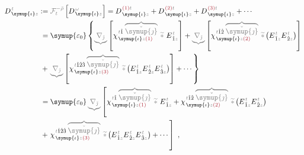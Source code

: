 \begin{subequations}
\begin{align}
	D^{\;\!\mathcolor{gray}{t}}_{\;\! \symup{\iota}\mathcolor{gray}{z}} &:= \mathcolor{gray}{\mathcal F^{-\bar{\rho}}_{t}} \left[ D^{\;\! \mathcolor{gray}{\omega}}_{\;\! \symup{\iota}\mathcolor{gray}{z}} \right] = D^{\;\! \textcolor{Maroon}{(1)} \mathcolor{gray}{t}}_{\;\! \symup{\iota}\mathcolor{gray}{z}} + D^{\;\! \textcolor{Maroon}{(2)} \mathcolor{gray}{t}}_{\;\! \symup{\iota}\mathcolor{gray}{z}} + D^{\;\! \textcolor{Maroon}{(3)} \mathcolor{gray}{t}}_{\;\! \symup{\iota}\mathcolor{gray}{z}} + \cdots \\
	&\hphantom{:}= {\symup{\varepsilon_0}} \left\{ \mathcolor{gray}{\underbrace{\nabla_{\check{\jmath}}}} \left[ \chi^{\;\! \mathcolor{gray}{t} \hat{1} \;\! \mathcolor{gray}{\overbrace{\check{\symup{\jmath}}}}}_{\;\! \symup{\iota} \mathcolor{gray}{z} \textcolor{Maroon}{(1)}} ~\mathcolor{gray}{\widetilde *}~ E^{\;\!\mathcolor{gray}{t}}_{\;\! \hat{1} \mathcolor{gray}{z}} \right] + \mathcolor{gray}{\underbrace{\nabla_{\check{\jmath}}}} \left[ \chi^{\;\! \mathcolor{gray}{t} \hat{1} \hat{2} \;\! \mathcolor{gray}{\overbrace{\check{\symup{\jmath}}}}}_{\;\! \symup{\iota} \mathcolor{gray}{z} \textcolor{Maroon}{(2)}} ~\mathcolor{gray}{\widetilde *} \left( E^{\;\!\mathcolor{gray}{t}}_{\;\! \hat{1} \mathcolor{gray}{z}} E^{\;\!\mathcolor{gray}{t}}_{\;\! \hat{2} \mathcolor{gray}{z}} \right) \right] \right. \label{eq:D_trho} \\ &\hphantom{:}+ \left. \mathcolor{gray}{\underbrace{\nabla_{\check{\jmath}}}} \left[ \chi^{\;\! \mathcolor{gray}{t} \hat{1} \hat{2} \hat{3} \;\! \mathcolor{gray}{\overbrace{\check{\symup{\jmath}}}}}_{\;\! \symup{\iota} \mathcolor{gray}{z} \textcolor{Maroon}{(3)}} ~\mathcolor{gray}{\widetilde *} \left( E^{\;\!\mathcolor{gray}{t}}_{\;\! \hat{1} \mathcolor{gray}{z}} E^{\;\!\mathcolor{gray}{t}}_{\;\! \hat{2} \mathcolor{gray}{z}} E^{\;\!\mathcolor{gray}{t}}_{\;\! \hat{3} \mathcolor{gray}{z}} \right) \right] + \cdots \right\}  \\
	&\hphantom{:}= {\symup{\varepsilon_0}} \mathcolor{gray}{\underbrace{\nabla_{\check{\jmath}}}} \left[ \chi^{\;\! \mathcolor{gray}{t} \hat{1} \;\! \mathcolor{gray}{\overbrace{\check{\symup{\jmath}}}}}_{\;\! \symup{\iota} \mathcolor{gray}{z} \textcolor{Maroon}{(1)}} ~\mathcolor{gray}{\widetilde *}~ E^{\;\!\mathcolor{gray}{t}}_{\;\! \hat{1} \mathcolor{gray}{z}} + \chi^{\;\! \mathcolor{gray}{t} \hat{1} \hat{2} \;\! \mathcolor{gray}{\overbrace{\check{\symup{\jmath}}}}}_{\;\! \symup{\iota} \mathcolor{gray}{z} \textcolor{Maroon}{(2)}} ~\mathcolor{gray}{\widetilde *} \left( E^{\;\!\mathcolor{gray}{t}}_{\;\! \hat{1} \mathcolor{gray}{z}} E^{\;\!\mathcolor{gray}{t}}_{\;\! \hat{2} \mathcolor{gray}{z}} \right) \right. \label{eq:D_trho2} \\ &\hphantom{:}+ \left. \chi^{\;\! \mathcolor{gray}{t} \hat{1} \hat{2} \hat{3} \;\! \mathcolor{gray}{\overbrace{\check{\symup{\jmath}}}}}_{\;\! \symup{\iota} \mathcolor{gray}{z} \textcolor{Maroon}{(3)}} ~\mathcolor{gray}{\widetilde *} \left( E^{\;\!\mathcolor{gray}{t}}_{\;\! \hat{1} \mathcolor{gray}{z}} E^{\;\!\mathcolor{gray}{t}}_{\;\! \hat{2} \mathcolor{gray}{z}} E^{\;\!\mathcolor{gray}{t}}_{\;\! \hat{3} \mathcolor{gray}{z}} \right) + \cdots \right]~,

\end{align}
\end{subequations}
